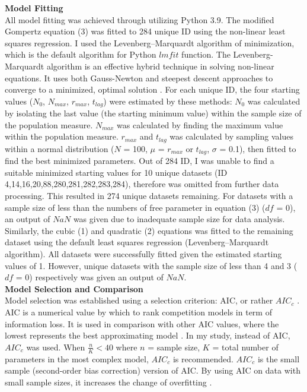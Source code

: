\documentclass[11pt]{article}
\begin{document}
\noindent\textbf{Model Fitting}\\

All model fitting was achieved through utilizing Python 3.9. The modified Gompertz equation (3) was fitted to 284 unique ID 
using the non-linear least squares regression. I used the Levenberg–Marquardt algorithm of minimization, which is the default 
algorithm for Python $lmfit$ function.  The Levenberg-Marquardt algorithm is an effective 
hybrid technique in solving non-linear equations. It uses both Gauss-Newton and steepest descent approaches to converge 
to a minimized, optimal solution \cite{wilson_chapter_2013}. For each unique ID, the four starting values ($N_{0}$, $N_{max}$, $r_{max}$, $t_{lag}$)
were estimated by these methods: $N_{0}$ was calculated by isolating the last value (the starting minimum value) within the sample size of 
the population measure. $N_{max}$ was calculated by finding the maximum value within the population measure. $r_{max}$ and $t_{lag}$
was calculated by sampling values within a normal distribution ($N$ = 100, $\mu$ = $r_{max}$ or $t_{lag}$, $\sigma$ = 0.1), then fitted  
to find the best minimized parameters. Out of 284 ID, I was unable to find a suitable minimized starting values for 10 unique datasets
(ID 4,14,16,20,88,280,281,282,283,284), therefore was omitted from further data processing. This resulted in 274 unique datasets remaining. 
For datasets with a sample size of less than the numbers of free parameter in equation (3) ($df$ = 0), an output of $NaN$ was given due to 
inadequate sample size for data analysis. Similarly, the cubic (1) and quadratic (2) equations was fitted to the remaining dataset 
using the default least squares regression (Levenberg–Marquardt algorithm). All datasets were successfully fitted given the 
estimated starting values of 1. However, unique datasets with the sample size of less than 4 and 3 ($df$ = 0) respectively was given an output of $NaN$.\\ 

\noindent\textbf{Model Selection and Comparison}\\

Model selection was established using a selection criterion: AIC, or rather $AIC_{c}$ \cite{burnham_multimodel_2004}. AIC is a numerical value by which to 
rank competition models in term of information loss. It is used in comparison with other AIC values, where the lowest 
represents the best approximating model \cite{symonds_brief_2011}. In my study, instead of AIC, $AIC_{c}$ was used. When \(\frac{n}{K}<40\) where $n$ = sample size,
$K$ = total number of parameters in the most complex model, $AIC_{c}$ is recommended. $AIC_{c}$ is the small 
sample (second-order bias correction) version of AIC. By using AIC on data with small sample sizes, it increases the change 
of overfitting \cite{burnham_multimodel_2004}.\\
\end{document}

